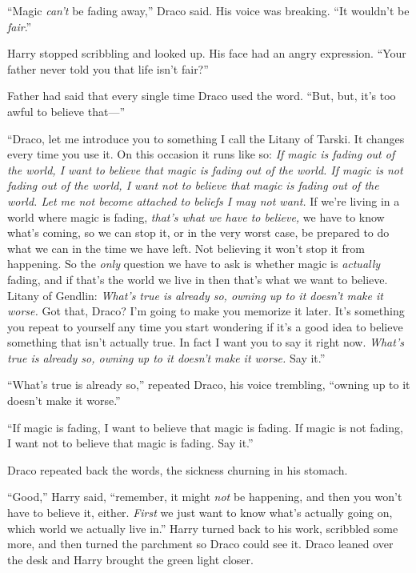 “Magic \emph{can’t} be fading away,” Draco said. His voice was breaking. “It wouldn’t be \emph{fair}.”

Harry stopped scribbling and looked up. His face had an angry expression. “Your father never told you that life isn’t fair?”

Father had said that every single time Draco used the word. “But, but, it’s too awful to believe that—”

“Draco, let me introduce you to something I call the Litany of Tarski. It changes every time you use it. On this occasion it runs like so: \emph{If magic is fading out of the world, I want to believe that magic is fading out of the world. If magic is not fading out of the world, I want not to believe that magic is fading out of the world. Let me not become attached to beliefs I may not want.} If we’re living in a world where magic is fading, \emph{that’s what we have to believe,} we have to know what’s coming, so we can stop it, or in the very worst case, be prepared to do what we can in the time we have left. Not believing it won’t stop it from happening. So the \emph{only} question we have to ask is whether magic is \emph{actually} fading, and if that’s the world we live in then that’s what we want to believe. Litany of Gendlin: \emph{What’s true is already so, owning up to it doesn’t make it worse.} Got that, Draco? I’m going to make you memorize it later. It’s something you repeat to yourself any time you start wondering if it’s a good idea to believe something that isn’t actually true. In fact I want you to say it right now. \emph{What’s true is already so, owning up to it doesn’t make it worse.} Say it.”

“What’s true is already so,” repeated Draco, his voice trembling, “owning up to it doesn’t make it worse.”

“If magic is fading, I want to believe that magic is fading. If magic is not fading, I want not to believe that magic is fading. Say it.”

Draco repeated back the words, the sickness churning in his stomach.

“Good,” Harry said, “remember, it might \emph{not} be happening, and then you won’t have to believe it, either. \emph{First} we just want to know what’s actually going on, which world we actually live in.” Harry turned back to his work, scribbled some more, and then turned the parchment so Draco could see it. Draco leaned over the desk and Harry brought the green light closer.

